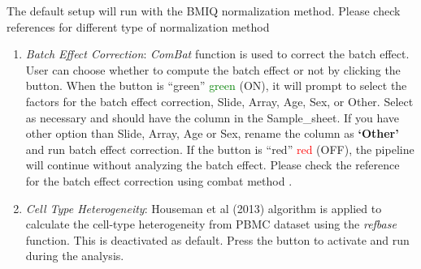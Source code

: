 \documentclass[
  a4paper,
  oneside,
  open=any]{scrreport}
\begin{document}
The default setup will run with the BMIQ normalization method. Please
check references for different type of normalization method

\begin{enumerate}
\def\labelenumi{\arabic{enumi}.}
\setcounter{enumi}{3}
\item
  \emph{Batch Effect Correction}: \emph{ComBat} function is used to
  correct the batch effect. User can choose whether to compute the batch
  effect or not by clicking the button. When the button is {``green''}
  \textcolor{green}{green} (ON), it will prompt to select the factors
  for the batch effect correction, Slide, Array, Age, Sex, or Other.
  Select as necessary and should have the column in the Sample\_sheet.
  If you have other option than Slide, Array, Age or Sex, rename the
  column as \textbf{`Other'} and run batch effect correction. If the
  button is {``red''} \textcolor{red}{red} (OFF), the pipeline will
  continue without analyzing the batch effect. Please check the
  reference for the batch effect correction using combat method
  \autocite{johnson2007adjusting}.
\item
  \emph{Cell Type Heterogeneity}: Houseman et al (2013)
  \autocite{houseman2012dna} algorithm is applied to calculate the
  cell-type heterogeneity from PBMC dataset using the \emph{refbase}
  function. This is deactivated as default. Press the button to activate
  and run during the analysis.\\
\end{enumerate}
\end{document}
